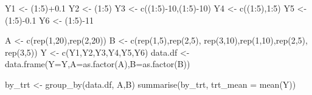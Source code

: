 \documentclass[
]{book}
\newenvironment{Shaded}{\begin{snugshade}}{\end{snugshade}}
\newcommand{\AttributeTok}[1]{\textcolor[rgb]{0.77,0.63,0.00}{#1}}
\newcommand{\DecValTok}[1]{\textcolor[rgb]{0.00,0.00,0.81}{#1}}
\newcommand{\FloatTok}[1]{\textcolor[rgb]{0.00,0.00,0.81}{#1}}
\newcommand{\FunctionTok}[1]{\textcolor[rgb]{0.00,0.00,0.00}{#1}}
\newcommand{\NormalTok}[1]{#1}
\newcommand{\OtherTok}[1]{\textcolor[rgb]{0.56,0.35,0.01}{#1}}
\newcommand{\SpecialCharTok}[1]{\textcolor[rgb]{0.00,0.00,0.00}{#1}}
\begin{document}
\begin{Shaded}
\begin{Highlighting}[]
\NormalTok{Y1 }\OtherTok{\textless{}{-}}\NormalTok{ (}\DecValTok{1}\SpecialCharTok{:}\DecValTok{5}\NormalTok{)}\SpecialCharTok{+}\FloatTok{0.1}
\NormalTok{Y2 }\OtherTok{\textless{}{-}}\NormalTok{ (}\DecValTok{1}\SpecialCharTok{:}\DecValTok{5}\NormalTok{)}
\NormalTok{Y3 }\OtherTok{\textless{}{-}} \FunctionTok{c}\NormalTok{((}\DecValTok{1}\SpecialCharTok{:}\DecValTok{5}\NormalTok{)}\SpecialCharTok{{-}}\DecValTok{10}\NormalTok{,(}\DecValTok{1}\SpecialCharTok{:}\DecValTok{5}\NormalTok{)}\SpecialCharTok{{-}}\DecValTok{10}\NormalTok{) }
\NormalTok{Y4 }\OtherTok{\textless{}{-}} \FunctionTok{c}\NormalTok{((}\DecValTok{1}\SpecialCharTok{:}\DecValTok{5}\NormalTok{),}\DecValTok{1}\SpecialCharTok{:}\DecValTok{5}\NormalTok{)}
\NormalTok{Y5 }\OtherTok{\textless{}{-}}\NormalTok{ (}\DecValTok{1}\SpecialCharTok{:}\DecValTok{5}\NormalTok{)}\SpecialCharTok{{-}}\FloatTok{0.1}
\NormalTok{Y6 }\OtherTok{\textless{}{-}}\NormalTok{ (}\DecValTok{1}\SpecialCharTok{:}\DecValTok{5}\NormalTok{)}\SpecialCharTok{{-}}\DecValTok{11}

\NormalTok{A }\OtherTok{\textless{}{-}} \FunctionTok{c}\NormalTok{(}\FunctionTok{rep}\NormalTok{(}\DecValTok{1}\NormalTok{,}\DecValTok{20}\NormalTok{),}\FunctionTok{rep}\NormalTok{(}\DecValTok{2}\NormalTok{,}\DecValTok{20}\NormalTok{))}
\NormalTok{B }\OtherTok{\textless{}{-}} \FunctionTok{c}\NormalTok{(}\FunctionTok{rep}\NormalTok{(}\DecValTok{1}\NormalTok{,}\DecValTok{5}\NormalTok{),}\FunctionTok{rep}\NormalTok{(}\DecValTok{2}\NormalTok{,}\DecValTok{5}\NormalTok{), }\FunctionTok{rep}\NormalTok{(}\DecValTok{3}\NormalTok{,}\DecValTok{10}\NormalTok{),}\FunctionTok{rep}\NormalTok{(}\DecValTok{1}\NormalTok{,}\DecValTok{10}\NormalTok{),}\FunctionTok{rep}\NormalTok{(}\DecValTok{2}\NormalTok{,}\DecValTok{5}\NormalTok{), }\FunctionTok{rep}\NormalTok{(}\DecValTok{3}\NormalTok{,}\DecValTok{5}\NormalTok{))}
\NormalTok{Y }\OtherTok{\textless{}{-}} \FunctionTok{c}\NormalTok{(Y1,Y2,Y3,Y4,Y5,Y6)}
\NormalTok{data.df }\OtherTok{\textless{}{-}} \FunctionTok{data.frame}\NormalTok{(}\AttributeTok{Y=}\NormalTok{Y,}\AttributeTok{A=}\FunctionTok{as.factor}\NormalTok{(A),}\AttributeTok{B=}\FunctionTok{as.factor}\NormalTok{(B))}

\NormalTok{by\_trt }\OtherTok{\textless{}{-}} \FunctionTok{group\_by}\NormalTok{(data.df, A,B)}
\FunctionTok{summarise}\NormalTok{(by\_trt, }\AttributeTok{trt\_mean =} \FunctionTok{mean}\NormalTok{(Y))}
\end{Highlighting}
\end{Shaded}
\end{document}
